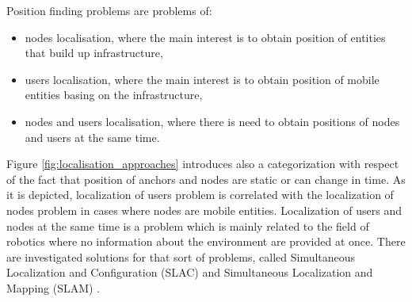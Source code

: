 \documentclass[../main.tex]{subfiles}
\begin{document}
Position finding problems are problems of:
\begin{itemize}
 	\item nodes localisation, where the main interest is to obtain position of entities that build up infrastructure,
 	\item users localisation, where the main interest is to obtain position of mobile entities basing on the infrastructure,
 	\item nodes and users localisation, where there is need to obtain positions of nodes and users at the same time.
 \end{itemize}
Figure \ref{fig:localisation_approaches} introduces also a categorization with respect of the fact that position of anchors and nodes are static or can change in time. As it is depicted, localization of users problem is correlated with the localization of nodes problem in cases where nodes are mobile entities. Localization of users and nodes at the same time is a problem which is mainly related to the field of robotics where no information about the environment are provided at once. There are investigated solutions for that sort of problems, called Simultaneous Localization and Configuration (SLAC) and Simultaneous Localization and Mapping (SLAM) \cite{discover_beacons_and_position}.
\end{document}

